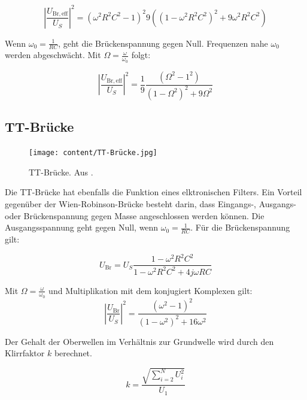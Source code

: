 \begin{equation}
\left\lvert\frac{U_\mathrm{Br,eff}}{U_S}\right\rvert^2 = {(\omega^2 R^2 C^2 -1)^2}{9((1 - \omega^2 R^2 C^2)^2 + 9\omega^2 R^2 C^2)}
\end{equation}

Wenn $\omega_0 = \frac{1}{RC}$, geht die Brückenspannung gegen Null. Frequenzen nahe $\omega_0$ werden abgeschwächt.
Mit $\Omega = \frac{\omega}{\omega_0}$ folgt:

\begin{equation}
  \left\lvert \frac{U_\mathrm{Br,eff}}{U_S} \right\rvert^2 = \frac{1}{9} \frac {(\Omega^2 -1^2)}{(1 - \Omega^2)^2 + 9 \Omega^2}
\end{equation}

\subsection{TT-Brücke}
\begin{figure}
  \centering
  \texttt{[image: content/TT-Brücke.jpg]}
  \caption{TT-Brücke. Aus \cite{anleitung302}.}
  \label{fig:tt}
\end{figure}

Die TT-Brücke hat ebenfalls die Funktion eines elktronischen Filters. Ein Vorteil gegenüber der Wien-Robinson-Brücke besteht darin, dass Eingangs-, Ausgangs- oder Brückenspannung gegen Masse angeschlossen werden können.
Die Ausgangsspannung geht gegen Null, wenn $\omega_0 = \frac{1}{RC}$.
Für die Brückenspannung gilt:

\begin{equation}
  U_\mathrm{Br} = U_S \frac{1 - \omega^2 R^2 C^2}{1 - \omega^2 R^2 C^2 + 4j \omega R C}
\end{equation}

Mit $\Omega = \frac{\omega}{\omega_0}$ und Multiplikation mit dem konjugiert Komplexen gilt:
\begin{equation}
 \left\lvert\frac{U_\mathrm{Br}}{U_S}\right\rvert^2 = \frac{(\omega^2 - 1)^2}{(1 - \omega^2)^2 + 16\omega^2}
\end{equation}

Der Gehalt der Oberwellen im Verhältnis zur Grundwelle wird durch den Klirrfaktor $k$ berechnet.

\begin{equation}
  k = \frac{\sqrt{\sum_{i=2}^N U_i^2}}{U_{1}}
\end{equation}
